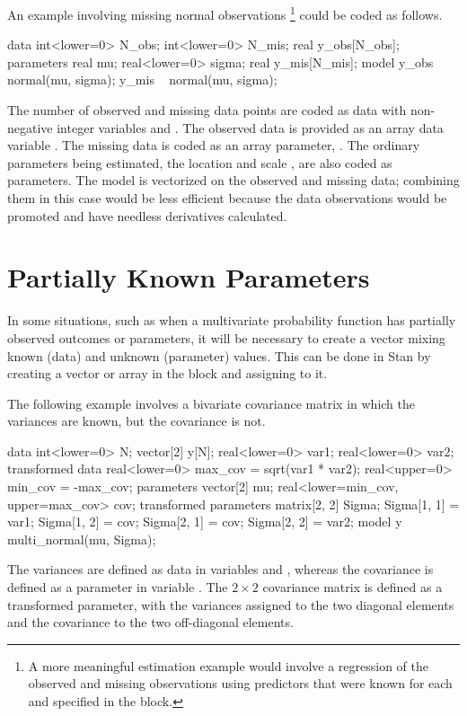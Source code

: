 An example involving missing normal observations%
%
\footnote{A more meaningful estimation example would involve a
  regression of the observed and missing observations using predictors
  that were known for each and specified in the  block.}
%
could be coded as follows.
%
\begin{stancode}
data {
  int<lower=0> N_obs;
  int<lower=0> N_mis;
  real y_obs[N_obs];
}
parameters {
  real mu;
  real<lower=0> sigma;
  real y_mis[N_mis];
}
model {
  y_obs ~ normal(mu, sigma);
  y_mis ~ normal(mu, sigma);
}
\end{stancode}
%
The number of observed and missing data points are coded as data with
non-negative integer variables  and .  The
observed data is provided as an array data variable .
The missing data is coded as an array parameter, .  The
ordinary parameters being estimated, the location  and scale
, are also coded as parameters.  The model is vectorized
on the observed and missing data; combining them in this case would be
less efficient because the data observations would be promoted and
have needless derivatives calculated.


\section{Partially Known Parameters}\label{partially-known-parameters.section}

In some situations, such as when a multivariate probability function
has partially observed outcomes or parameters, it will be necessary to
create a vector mixing known (data) and unknown (parameter) values.
This can be done in Stan by creating a vector or array in the
 block and assigning to it.

The following example involves a bivariate covariance matrix in which the
variances are known, but the covariance is not.
%
\begin{stancode}
data {
  int<lower=0> N;
  vector[2] y[N];
  real<lower=0> var1;     real<lower=0> var2;
}
transformed data {
  real<lower=0> max_cov = sqrt(var1 * var2);  
  real<upper=0> min_cov = -max_cov;
}
parameters {
  vector[2] mu;
  real<lower=min_cov, upper=max_cov> cov;
}
transformed parameters {
  matrix[2, 2] Sigma;
  Sigma[1, 1] = var1;     Sigma[1, 2] = cov;
  Sigma[2, 1] = cov;      Sigma[2, 2] = var2;
}  
model {
  y ~ multi_normal(mu, Sigma);
}
\end{stancode}
%
The variances are defined as data in variables  and
, whereas the covariance is defined as a parameter in
variable .  The $2 \times 2$ covariance matrix 
is defined as a transformed parameter, with the variances assigned to
the two diagonal elements and the covariance to the two off-diagonal
elements.

